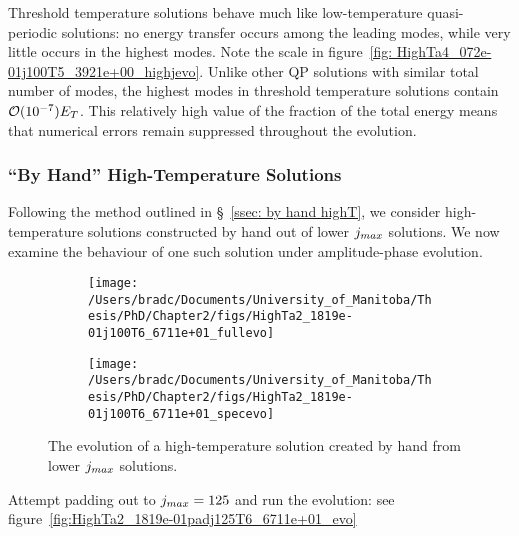\documentclass[../PhD.tex]{subfiles}
\begin{document}
Threshold temperature solutions behave much like low-temperature quasi-periodic solutions: no energy transfer occurs among the leading modes, while very little occurs in the highest modes. Note the scale in figure~\ref{fig: HighTa4_072e-01j100T5_3921e+00_highjevo}. Unlike other QP solutions with similar total number of modes, the highest modes in threshold temperature solutions contain $\mathcal O(10^{-7}) E_T $. This relatively high value of the fraction of the total energy means that numerical errors remain suppressed throughout the evolution.


\subsubsection{``By Hand'' High-Temperature Solutions}

Following the method outlined in \S~\!\ref{ssec: by hand highT}, we consider high-temperature solutions constructed by hand out of lower $j_{max}$ solutions. We now examine the behaviour of one such solution under amplitude-phase evolution. 

\begin{figure}[h!]
	\centering
	\begin{subfigure}[t]{0.45\textwidth}
		\texttt{[image: /Users/bradc/Documents/University\_of\_Manitoba/Thesis/PhD/Chapter2/figs/HighTa2\_1819e-01j100T6\_6711e+01\_fullevo]}
	\end{subfigure}
	\;
	\begin{subfigure}[t]{0.45\textwidth}
		\texttt{[image: /Users/bradc/Documents/University\_of\_Manitoba/Thesis/PhD/Chapter2/figs/HighTa2\_1819e-01j100T6\_6711e+01\_specevo]}
	\end{subfigure}
	\caption[Evolution of the energy spectrum for a high-temperature solution created by hand]{The evolution of a high-temperature solution created by hand from lower $j_{max}$ solutions.}
	\label{fig: HighTa2_1819e-01j100T6_6711e+01}
\end{figure}

Attempt padding out to $j_{max} = 125$ and run the evolution: see figure~\ref{fig:HighTa2_1819e-01padj125T6_6711e+01_evo}
\end{document}
